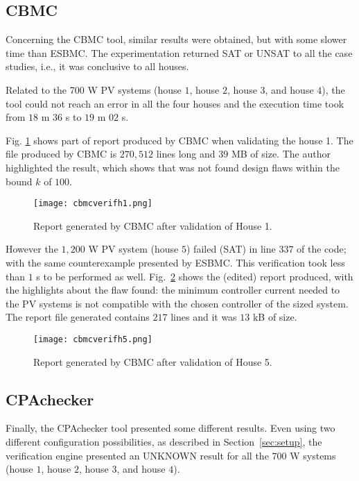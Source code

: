\subsection{CBMC}

Concerning the CBMC tool, similar results were obtained, but with some slower time than ESBMC. The experimentation returned SAT or UNSAT to all the case studies, i.e., it was conclusive to all houses. 

Related to the 700 W PV systems (house $1$, house $2$, house $3$, and house $4$), the tool could not reach an error in all the four houses and the execution time took from $18$ m $36$ s to $19$ m $02$ s. 

Fig. \ref{fig:cbmcverifhouse1} shows part of report produced by CBMC when validating the house 1. The file produced by CBMC is $270,512$ lines long and $39$ MB of size. The author highlighted the result, which shows that was not found design flaws within the bound $k$ of $100$.

\begin{figure}[h]
\texttt{[image: cbmcverifh1.png]}
\centering
\caption{Report generated by CBMC after validation of House 1.}
\label{fig:cbmcverifhouse1}
\end{figure}

However the $1,200$ W PV system (house $5$) failed (SAT) in line $337$ of the code; with the same counterexample presented by ESBMC. This verification took less than $1$ s to be performed as well. Fig.~\ref{fig:cbmcverifhouse5} shows the (edited) report produced, with the highlights about the flaw found: the minimum controller current needed to the PV systems is not compatible with the chosen controller of the sized system. The report file generated contains $217$ lines and it was $13$ kB of size.

\begin{figure}[h]
\texttt{[image: cbmcverifh5.png]}
\centering
\caption{Report generated by CBMC after validation of House 5.}
\label{fig:cbmcverifhouse5}
\end{figure}


\subsection{CPAchecker}

Finally, the CPAchecker tool presented some different results. Even using two different configuration possibilities, as described in Section~\ref{sec:setup}, the verification engine presented an UNKNOWN result for all the $700$ W systems (house $1$, house $2$, house $3$, and house $4$). 

